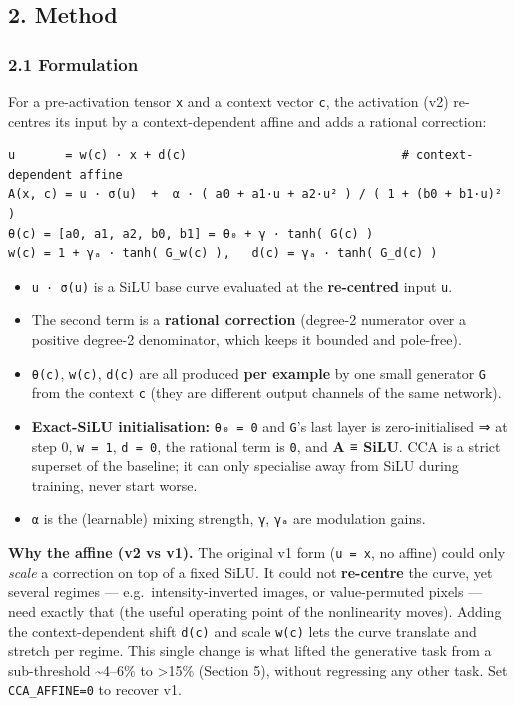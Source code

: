 \documentclass[
  11pt,
]{article}
\providecommand{\tightlist}{%
  \setlength{\itemsep}{0pt}\setlength{\parskip}{0pt}}
\begin{document}
\subsection{2. Method}\label{method}

\subsubsection{2.1 Formulation}\label{formulation}

For a pre-activation tensor \texttt{x} and a context vector \texttt{c},
the activation (v2) re-centres its input by a context-dependent affine
and adds a rational correction:

\begin{verbatim}
u       = w(c) · x + d(c)                              # context-dependent affine
A(x, c) = u · σ(u)  +  α · ( a0 + a1·u + a2·u² ) / ( 1 + (b0 + b1·u)² )
θ(c) = [a0, a1, a2, b0, b1] = θ₀ + γ · tanh( G(c) )
w(c) = 1 + γₐ · tanh( G_w(c) ),   d(c) = γₐ · tanh( G_d(c) )
\end{verbatim}

\begin{itemize}
\tightlist
\item
  \texttt{u\ ·\ σ(u)} is a SiLU base curve evaluated at the
  \textbf{re-centred} input \texttt{u}.
\item
  The second term is a \textbf{rational correction} (degree-2 numerator
  over a positive degree-2 denominator, which keeps it bounded and
  pole-free).
\item
  \texttt{θ(c)}, \texttt{w(c)}, \texttt{d(c)} are all produced
  \textbf{per example} by one small generator \texttt{G} from the
  context \texttt{c} (they are different output channels of the same
  network).
\item
  \textbf{Exact-SiLU initialisation:} \texttt{θ₀\ =\ 0} and \texttt{G}'s
  last layer is zero-initialised ⇒ at step 0, \texttt{w\ =\ 1},
  \texttt{d\ =\ 0}, the rational term is \texttt{0}, and \textbf{A ≡
  SiLU}. CCA is a strict superset of the baseline; it can only
  specialise away from SiLU during training, never start worse.
\item
  \texttt{α} is the (learnable) mixing strength, \texttt{γ}, \texttt{γₐ}
  are modulation gains.
\end{itemize}

\textbf{Why the affine (v2 vs v1).} The original v1 form
(\texttt{u\ =\ x}, no affine) could only \emph{scale} a correction on
top of a fixed SiLU. It could not \textbf{re-centre} the curve, yet
several regimes --- e.g.~intensity-inverted images, or value-permuted
pixels --- need exactly that (the useful operating point of the
nonlinearity moves). Adding the context-dependent shift \texttt{d(c)}
and scale \texttt{w(c)} lets the curve translate and stretch per regime.
This single change is what lifted the generative task from a
sub-threshold \textasciitilde4--6\% to \textgreater15\% (Section 5),
without regressing any other task. Set \texttt{CCA\_AFFINE=0} to recover
v1.
\end{document}
